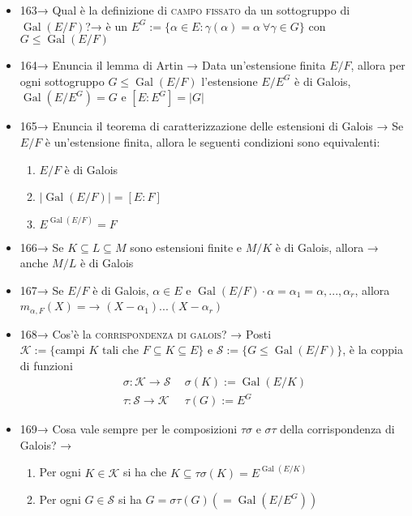 \documentclass[A4,12pt]{article}
\renewcommand{\subset}{\subseteq}
\begin{document}
\begin{itemize}[noitemsep]
\begin{enumerate}
		\end{enumerate} →
		\item 163→ Qual è la definizione di \textsc{campo fissato}  da un sottogruppo di $ \operatorname{Gal}(E/F) $?→ è un $ E^G:=\{\alpha\in E:\gamma(\alpha) =\alpha \ \forall \gamma \in G\} $ con $ G\leq \operatorname{Gal}(E/F) $
		\item 164→ Enuncia il lemma di Artin → Data un'estensione finita $ E/F $, allora per ogni sottogruppo $ G\leq \operatorname{Gal}(E/F) $ l'estensione $ E/E^G $ è di Galois, $ \operatorname{Gal}(E/E^G)=G $ e $ [E:E^G] = |G| $
		\item 165→ Enuncia il teorema di caratterizzazione delle estensioni di Galois → Se $ E/F $ è un'estensione finita, allora le seguenti condizioni sono equivalenti: \begin{enumerate}
			\item $ E/F $ è di Galois
			\item $ |\operatorname{Gal}(E/F)|=[E:F] $
			\item $ E^{\operatorname{Gal}(E/F)}=F $
		\end{enumerate}
		\item 166→ Se $ K\subset L\subset M $ sono estensioni finite e $ M/K $ è di Galois, allora → anche $ M/L $ è di Galois
		\item 167→ Se $ E/F $ è di Galois, $ \alpha \in E $ e $ \operatorname{Gal}(E/F)\cdot \alpha = {\alpha_1 = \alpha,...,\alpha_r} $, allora $ m_{\alpha, F}(X)= $→ $ (X-\alpha_1)...(X-\alpha_r) $
		\item 168→ Cos'è la \textsc{corrispondenza di galois}? → Posti $ \mathscr{K}:=\{\text{campi }K\text{ tali che } F\subset K\subset E\} $ e $ \mathscr{S}:= \{G\leq \operatorname{Gal}(E/F)\} $, è la coppia di funzioni \begin{align*}
			\sigma:\mathscr{K}\to \mathscr{S}\ \ & \sigma(K) := \operatorname{Gal}(E/K)\\
			\tau:\mathscr{S}\to \mathscr{K}\ \ & \tau(G):=E^G
		\end{align*}
		\item 169→ Cosa vale sempre per le composizioni $ \tau\sigma $ e $ \sigma\tau $ della corrispondenza di Galois? → \begin{enumerate}
			\item Per ogni $ K\in \mathscr{K} $ si ha che $ K\subset \tau\sigma(K)=E^{\operatorname{Gal}(E/K)}$
			\item Per ogni $ G\in \mathscr{S} $ si ha $ G=\sigma\tau(G)(=\operatorname{Gal}(E/E^G)) $
		\end{enumerate}

\end{itemize}
\end{document}
